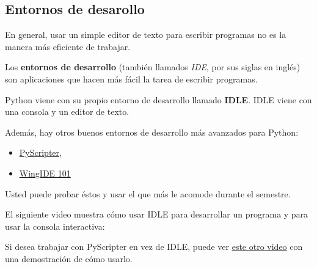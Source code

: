 \subsection{Entornos de desarollo}

En general, usar un simple editor de texto para escribir programas no es
la manera más eficiente de trabajar.

Los \textbf{entornos de desarrollo} (también llamados \emph{IDE}, por
sus siglas en inglés) son aplicaciones que hacen más fácil la tarea de
escribir programas.

Python viene con su propio entorno de desarrollo llamado \textbf{IDLE}.
IDLE viene con una consola y un editor de texto.

Además, hay otros buenos entornos de desarrollo más avanzados para
Python:

\begin{itemize}
\item
  \href{http://code.google.com/p/pyscripter/downloads/list}{PyScripter},
\item
  \href{http://www.wingware.com/downloads/wingide-101/3.2.12-1/binaries}{WingIDE
  101}
\end{itemize}

Usted puede probar éstos y usar el que más le acomode durante el
semestre.

El siguiente video muestra cómo usar IDLE para desarrollar un programa y
para usar la consola interactiva:

Si desea trabajar con PyScripter en vez de IDLE, puede ver
\href{http://www.youtube.com/watch?v=bzF5rDtQLS4}{este otro video} con
una demostración de cómo usarlo.
